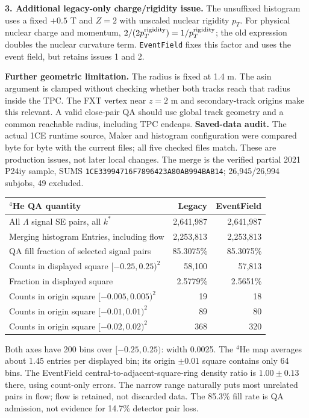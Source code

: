 \documentclass[10pt,a4paper]{article}
\begin{document}
\textbf{3. Additional legacy-only charge/rigidity issue.}
The unsuffixed histogram uses a fixed $+0.5$ T and $Z=2$ with unscaled nuclear rigidity $p_T$.
For physical nuclear charge and momentum, $2/(2p_T^{\rm rigidity})=1/p_T^{\rm rigidity}$;
the old expression doubles the nuclear curvature term. \texttt{EventField} fixes this factor and uses the event field,
but retains issues 1 and 2.

\textbf{Further geometric limitation.} The radius is fixed at 1.4 m. The asin argument is clamped without checking whether
both tracks reach that radius inside the TPC. The FXT vertex near $z=2$ m and secondary-track origins make this relevant.
A valid close-pair QA should use global track geometry and a common reachable radius, including TPC endcaps.
\newpage
\textbf{Saved-data audit.} The actual 1CE runtime source, Maker and histogram configuration were compared byte for byte
with the current files; all five checked files match. These are production issues, not later local changes.
The merge is the verified partial 2021 P24iy sample, SUMS
\texttt{1CE33994716F7896423A80AB994BAB14}; 26,945/26,994 subjobs, 49 excluded.

\begin{center}\begin{tabular}{lrr}\toprule
$^4$He QA quantity & Legacy & EventField\\\midrule
All $\Lambda$ signal SE pairs, all $k^*$ & 2,641,987 & 2,641,987\\
Merging histogram Entries, including flow & 2,253,813 & 2,253,813\\
QA fill fraction of selected signal pairs & 85.3075\% & 85.3075\%\\
Counts in displayed square $[-0.25,0.25)^2$ & 58,100 & 57,813\\
Fraction in displayed square & 2.5779\% & 2.5651\%\\
Counts in origin square $[-0.005,0.005)^2$ & 19 & 18\\
Counts in origin square $[-0.01,0.01)^2$ & 89 & 80\\
Counts in origin square $[-0.02,0.02)^2$ & 368 & 320\\\bottomrule\end{tabular}\end{center}
Both axes have 200 bins over $[-0.25,0.25)$: width 0.0025.
The $^4$He map averages about 1.45 entries per displayed bin; its origin $\pm0.01$ square contains only 64 bins.
The EventField central-to-adjacent-square-ring density ratio is $1.00\pm0.13$ there, using count-only errors.
The narrow range naturally puts most unrelated pairs in flow; flow is retained, not discarded data.
The 85.3\% fill rate is QA admission, not evidence for 14.7\% detector pair loss.
\end{document}
